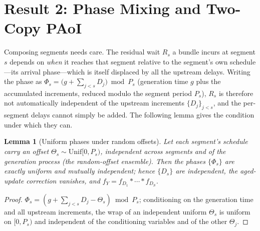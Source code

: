 \documentclass[twocolumn,3p,times,procedia]{elsarticle}
\newtheorem{lemma}{Lemma}
\begin{document}
\section{Result 2: Phase Mixing and Two-Copy PAoI}\label{sec:r2}
Composing segments needs care. The residual wait $R_s$ a bundle incurs at
segment $s$ depends on \emph{when} it reaches that segment relative to the
segment's own schedule---its arrival phase---which is itself displaced by
all the upstream delays. Writing the phase as
$\Phi_s=\bigl(g+\sum_{j<s}D_j\bigr)\bmod P_s$ (generation time $g$ plus the
accumulated increments, reduced modulo the segment period $P_s$), $R_s$ is
therefore not automatically independent of the upstream increments
$\{D_j\}_{j<s}$, and the per-segment delays cannot simply be added. The
following lemma gives the condition under which they can.

\begin{lemma}[Uniform phases under random offsets]\label{lem:mix}
Let each segment's schedule carry an offset $\Theta_s\sim
\mathrm{Unif}[0,P_s)$, independent across segments and of the
generation process (the \emph{random-offset ensemble}). Then the phases
$\{\Phi_s\}$ are exactly uniform and mutually independent; hence
$\{D_s\}$ are independent, the aged-update correction vanishes, and
$f_Y=f_{D_1}\ast\cdots\ast f_{D_S}$.
\end{lemma}
\begin{proof}
$\Phi_s=(g+\sum_{j<s}D_j-\Theta_s)\bmod P_s$; conditioning on the
generation time and all upstream increments, the wrap of an independent
uniform $\Theta_s$ is uniform on $[0,P_s)$ and independent of the
conditioning variables and of the other $\Theta_j$.
\end{proof}
\end{document}
